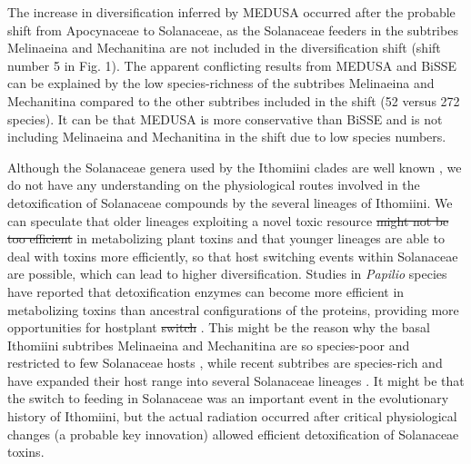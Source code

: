 \documentclass[10pt]{article}
\providecommand{\DIFaddtex}[1]{{\protect\color{blue}\uwave{#1}}} %
\providecommand{\DIFdeltex}[1]{{\protect\color{red}\sout{#1}}}                      %
\providecommand{\DIFaddbegin}{} %
\providecommand{\DIFaddend}{} %
\providecommand{\DIFdelbegin}{} %
\providecommand{\DIFdelend}{} %
\providecommand{\DIFadd}[1]{\texorpdfstring{\DIFaddtex{#1}}{#1}} %
\providecommand{\DIFdel}[1]{\texorpdfstring{\DIFdeltex{#1}}{}} %
\begin{document}
The increase in diversification \DIFaddbegin \DIFadd{rate }\DIFaddend inferred by MEDUSA occurred after the
probable shift from Apocynaceae to Solanaceae, as the Solanaceae feeders
in the subtribes Melinaeina and Mechanitina are not included in the
diversification shift (shift number 5 in Fig. 1). The apparent
conflicting results from MEDUSA and BiSSE can be explained by the low
species-richness of the subtribes Melinaeina and Mechanitina compared to
the other subtribes included in the shift (52 versus 272 species). It
can be that MEDUSA is more conservative than BiSSE and is not including
Melinaeina and Mechanitina in the shift due to low species numbers.

Although the Solanaceae genera used by the Ithomiini clades are well
known \cite{willmott2006}, we do not have any understanding on the physiological
routes involved in the detoxification of Solanaceae compounds by the
several lineages of Ithomiini. We can speculate that older lineages
exploiting a novel toxic resource \cite{willmott2006, wahlberg2009} 
\DIFdelbegin \DIFdel{might not be too efficient
}\DIFdelend \DIFaddbegin \DIFadd{may be inefficient
}\DIFaddend in metabolizing plant toxins and that younger lineages are able to deal
with toxins more efficiently, so that host switching events within
Solanaceae are possible, which can lead to higher diversification.
Studies in \emph{Papilio} species have reported that detoxification
enzymes can become more efficient in metabolizing toxins than ancestral
configurations of the proteins, providing more opportunities for
hostplant \DIFdelbegin \DIFdel{switch }\DIFdelend \DIFaddbegin \DIFadd{switches }\DIFaddend \cite{li2003}. This might be the reason why the basal
Ithomiini subtribes Melinaeina and Mechanitina are so species-poor and
restricted to few Solanaceae hosts \cite{willmott2006}, while recent subtribes are
species-rich and have expanded their host range into several Solanaceae
lineages \cite{willmott2006}. It might be that the switch to feeding in Solanaceae
was an important event in the evolutionary history of Ithomiini, but the
actual radiation occurred after critical physiological changes (a
probable key innovation) allowed efficient detoxification of Solanaceae
toxins.
\end{document}
